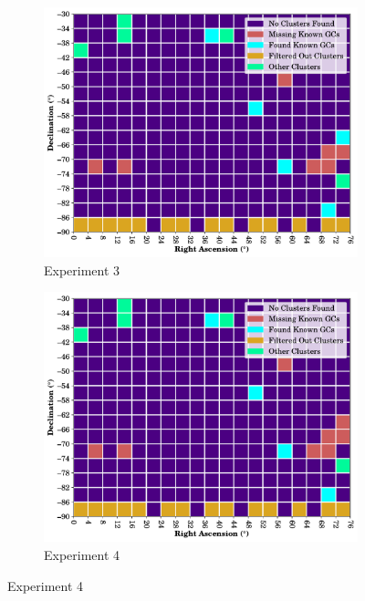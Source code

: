 \begin{figure}[H]
    \begin{subfigure}[b]{0.49\textwidth}
        \includegraphics[width=\textwidth]{./figures/rasters/grids/grid-run-03-a3.pdf}
        \caption{Experiment 3}
    \end{subfigure}
    \begin{subfigure}[b]{0.49\textwidth}
        \includegraphics[width=\textwidth]{./figures/rasters/grids/grid-run-04-a3.pdf}
        \caption{Experiment 4}
    \end{subfigure}


\end{figure}
